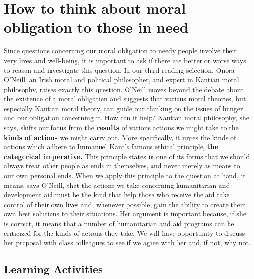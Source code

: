 \documentclass[
]{book}
\begin{document}
\hypertarget{how-to-think-about-moral-obligation-to-those-in-need}{%
\section*{How to think about moral obligation to those in need}\label{how-to-think-about-moral-obligation-to-those-in-need}}

Since questions concerning our moral obligation to needy people involve their very lives and well-being, it is important to ask if there are better or worse ways to reason and investigate this question. In our third reading selection, Onora O'Neill, an Irish moral and political philosopher, and expert in Kantian moral philosophy, raises exactly this question. O'Neill moves beyond the debate about the existence of a moral obligation and suggests that various moral theories, but especially Kantian moral theory, can guide our thinking on the issues of hunger and our obligation concerning it. How can it help?
Kantian moral philosophy, she says, shifts our focus from the \textbf{results} of various actions we might take to the \textbf{kinds of actions} we might carry out.
More specifically, it urges the kinds of actions which adhere to Immanuel Kant's famous ethical principle, \textbf{the categorical imperative.} This principle states in one of its forms that we should always treat other people as ends in themselves, and never merely as means to our own personal ends.
When we apply this principle to the question at hand, it means, says O'Neill, that the actions we take concerning humanitarian and development aid must be the kind that help those who receive the aid take control of their own lives and, whenever possible, gain the ability to create their own best solutions to their situations.
Her argument is important because, if she is correct, it means that a number of humanitarian and aid programs can be criticized for the kinds of actions they take. We will have opportunity to discuss her proposal with class colleagues to see if we agree with her and, if not, why not.

\hypertarget{learning-activities-25}{%
\subsection*{Learning Activities}\label{learning-activities-25}}
\end{document}
